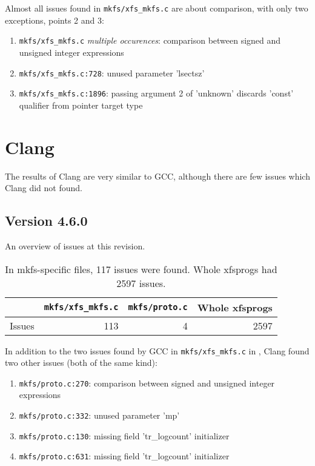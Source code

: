 Almost all issues found in {\tt mkfs/xfs\_mkfs.c} are about comparison, with
only two exceptions, points 2 and 3:
\begin{enumerate}
	\item {\tt mkfs/xfs\_mkfs.c} {\em multiple occurences}: comparison
		between signed and unsigned integer expressions
	\item {\tt mkfs/xfs\_mkfs.c:728}: unused parameter 'lsectsz'
	\item {\tt mkfs/xfs\_mkfs.c:1896}: passing argument 2 of 'unknown'
		discards 'const' qualifier from pointer target type
\end{enumerate}


\section{Clang}\label{chap:results:clang}
The results of Clang are very similar to GCC, although there are few issues
which Clang did not found.

\subsection{Version 4.6.0}\label{chap:results:clang:4.6}

An overview of issues at this revision.
\begin{table}[h]
\begin{tabular}{|l||r|r||r|}
\hline
& {\tt mkfs/xfs\_mkfs.c} & {\tt mkfs/proto.c} & Whole xfsprogs \\
\hline
Issues & 113 & 4 & 2597 \\
\hline
\end{tabular}
\caption{In mkfs-specific files, 117 issues were found. Whole
xfsprogs had 2597 issues.}
\end{table}

In addition to the two issues found by GCC in {\tt mkfs/xfs\_mkfs.c} in , Clang found two other issues (both of the same kind):
\begin{enumerate}
	\item {\tt mkfs/proto.c:270}: comparison between signed and unsigned integer expressions
	\item {\tt mkfs/proto.c:332}: unused parameter 'mp'
	\item {\tt mkfs/proto.c:130}: missing field 'tr\_logcount' initializer
	\item {\tt mkfs/proto.c:631}: missing field 'tr\_logcount' initializer
\end{enumerate}

